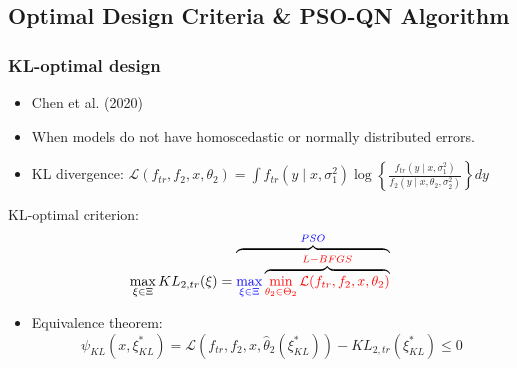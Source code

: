 \documentclass[xcolor=dvipsnames,aspectratio=1610]{beamer}
\begin{document}


\subsection{Optimal Design Criteria \& PSO-QN Algorithm}
\begin{frame}
\frametitle{KL-optimal design}

\begin{itemize}
\item Chen et al. (2020)
\item When models do not have homoscedastic or normally distributed errors.
\item KL divergence:
$\mathcal{L}(f_{tr},f_2,x,\theta_2)=\int f_{tr}(y\mid x,\sigma_1^2)\log\left\{\frac{f_{tr}(y\mid x,\sigma_1^2)}{f_{2}(y\mid x,\theta_2,\sigma_2^2)}\right\} dy$
\end{itemize}

KL-optimal criterion:
$$\max_{\xi\in \Xi} KL_{2,tr}(\xi)=\overbrace{\textcolor{blue}{\max_{\xi\in \Xi}} \overbrace{\textcolor{red}{\min_{\substack{\theta_2\in \Theta_2}}\mathcal{L}(f_{tr},f_2,x,\theta_2)}}^{\textcolor{red}{L-BFGS}}}^{\textcolor{blue}{PSO}}$$

\begin{itemize}
\item Equivalence theorem:
$$\psi_{KL}(x,\xi_{KL}^\ast)=\mathcal{L}(f_{tr},f_2,x,\hat{\theta}_2(\xi_{KL}^\ast))-KL_{2,tr}(\xi_{KL}^\ast)\leq 0$$
\end{itemize}
\end{frame}
\end{document}
